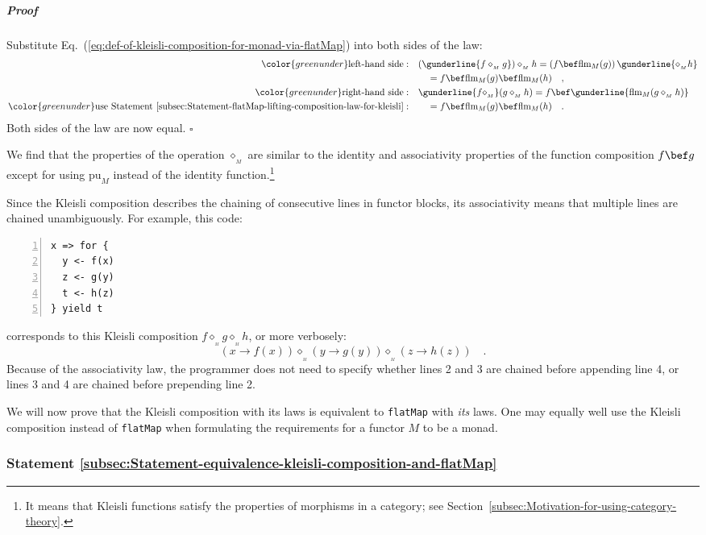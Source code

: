 \subparagraph{Proof}

Substitute Eq.~(\ref{eq:def-of-kleisli-composition-for-monad-via-flatMap})
into both sides of the law:
\begin{align*}
{\color{greenunder}\text{left-hand side}:}\quad & (\gunderline{f\diamond_{_{M}}g})\diamond_{_{M}}h=\left(f\bef\text{flm}_{M}(g)\right)\gunderline{\diamond_{_{M}}h}\\
 & \quad=f\bef\text{flm}_{M}(g)\bef\text{flm}_{M}(h)\quad,\\
{\color{greenunder}\text{right-hand side}:}\quad & \gunderline{f\diamond_{_{M}}}(g\diamond_{_{M}}h)=f\bef\gunderline{\text{flm}_{M}(g\diamond_{_{M}}h)}\\
{\color{greenunder}\text{use Statement~\ref{subsec:Statement-flatMap-lifting-composition-law-for-kleisli}}:}\quad & \quad=f\bef\text{flm}_{M}(g)\bef\text{flm}_{M}(h)\quad.
\end{align*}
Both sides of the law are now equal. $\square$

We find that the properties of the operation $\diamond_{_{M}}$ are
similar to the identity and associativity properties of the function
composition $f\bef g$ except for using $\text{pu}_{M}$ instead of
the identity function.\footnote{It means that Kleisli functions satisfy the properties of morphisms
in a category; see Section~\ref{subsec:Motivation-for-using-category-theory}.}

Since the Kleisli composition describes the chaining of consecutive
lines in functor blocks, its associativity means that multiple lines
are chained unambiguously. For example, this code:
\begin{lstlisting}[numbers=left]
x => for {
  y <- f(x)
  z <- g(y)
  t <- h(z)
} yield t
\end{lstlisting}
corresponds to this Kleisli composition $f\diamond_{_{_{M}}}g\diamond_{_{_{M}}}h$,
or more verbosely:
\[
(x\rightarrow f(x))\diamond_{_{_{M}}}(y\rightarrow g(y))\diamond_{_{_{M}}}(z\rightarrow h(z))\quad.
\]
Because of the associativity law, the programmer does not need to
specify whether lines 2 and 3 are chained before appending line 4,
or lines 3 and 4 are chained before prepending line 2.

We will now prove that the Kleisli composition with its laws is equivalent
to \lstinline!flatMap! with \emph{its} laws. One may equally well
use the Kleisli composition instead of \lstinline!flatMap! when formulating
the requirements for a functor $M$ to be a monad.

\subsubsection{Statement \label{subsec:Statement-equivalence-kleisli-composition-and-flatMap}\ref{subsec:Statement-equivalence-kleisli-composition-and-flatMap}}

